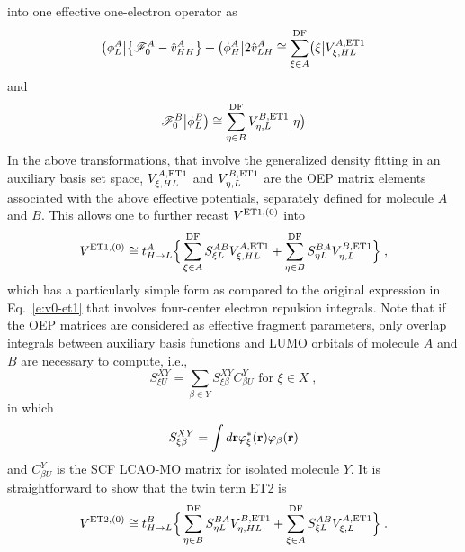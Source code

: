 into one effective one\hyp{}electron operator
as
%
\begin{equation}
 \bigl( {\phi_L^A} \bigl\lvert \left\{ \mathscr{F}_0^A - \hat{v}^A_{HH} \right\}
 + \bigl( {\phi_H^A} \bigl\lvert 2 \hat{v}^A_{LH} 
 \cong \sum_{\xi\in A}^{\rm DF} \bigl( {\xi} \bigl\lvert V^{A,{\rm ET1}}_{\xi,HL}
\end{equation}
%
and
%
\begin{equation}
 \mathscr{F}_0^B \bigr\rvert {\phi_L^B} \bigr) \cong \sum_{\eta\in B}^{\rm DF} V^{B,{\rm ET1}}_{\eta,L} \bigr\rvert {\eta} \bigr) 
\end{equation}
%
In the above transformations, that involve the generalized density fitting
in an auxiliary basis set space,
$V^{A,{\rm ET1}}_{\xi,HL}$ and $V^{B,{\rm ET1}}_{\eta,L}$
are the OEP matrix elements associated with the above
effective potentials, separately defined for molecule $A$ and $B$. This allows one to
further recast $V^{{\rm ET1},(0)}$ into
%
\begin{multline}\label{e:v0-et1-oep}
 V^{{\rm ET1},(0)} \cong t_{H\rightarrow L}^A \Big\{ 
 \sum_{\xi\in A}^{\rm DF} S_{\xi L}^{AB} V^{A,{\rm ET1}}_{\xi,HL} +
 \sum_{\eta\in B}^{\rm DF} S_{\eta L}^{BA} V^{B,{\rm ET1}}_{\eta,L}
 \Big\} \;,
\end{multline}
%
which has a particularly simple form as compared to the original expression
in Eq.~\eqref{e:v0-et1} that involves four\hyp{}center electron repulsion integrals.
Note that if 
the OEP matrices are considered
as effective fragment parameters, %
only overlap integrals between auxiliary basis functions and LUMO orbitals of molecule
$A$ and $B$ are necessary to compute, i.e.,
%
\begin{equation}
 S^{XY}_{\xi U} = \sum_{\beta\in Y} S_{\xi\beta}^{XY} C_{\beta U}^Y \text{ for $\xi\in X$} \;,
\end{equation}
%
in which 
%
\begin{equation}
 S_{\xi\beta}^{XY} = \int d{\bf r} \varphi_\xi^*({\bf r}) \varphi_\beta({\bf r})
\end{equation}
%
and $C_{\beta U}^Y$ is the SCF LCAO-MO matrix for isolated molecule $Y$.
It is straightforward to show that the twin term ET2 is
%
\begin{multline}\label{e:v0-et2-oep}
 V^{{\rm ET2},(0)} \cong t_{H\rightarrow L}^B \Big\{ 
 \sum_{\eta\in B}^{\rm DF} S_{\eta L}^{BA} V^{B,{\rm ET1}}_{\eta,HL} +
 \sum_{\xi\in A}^{\rm DF} S_{\xi L}^{AB} V^{A,{\rm ET1}}_{\xi,L}
 \Big\} \;.
\end{multline}
%

